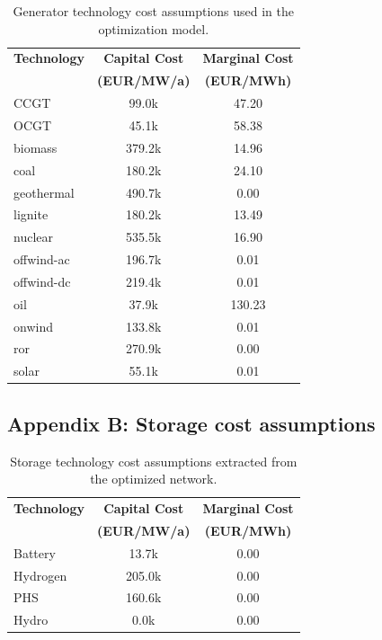\documentclass[preprint,12pt,nopreprintline]{elsarticle}
\begin{document}
\medskip
\noindent
\begin{table}[htbp]
\centering
\caption{Generator technology cost assumptions used in the optimization model.}
\label{tab:generator_costs_appendix}
\begin{tabular}{lcc}
\toprule
\textbf{Technology} & \textbf{Capital Cost} & \textbf{Marginal Cost} \\
 & \textbf{(EUR/MW/a)} & \textbf{(EUR/MWh)} \\
\midrule
CCGT & 99.0k & 47.20 \\
OCGT & 45.1k & 58.38 \\
biomass & 379.2k & 14.96 \\
coal & 180.2k & 24.10 \\
geothermal & 490.7k & 0.00 \\
lignite & 180.2k & 13.49 \\
nuclear & 535.5k & 16.90 \\
offwind-ac & 196.7k & 0.01 \\
offwind-dc & 219.4k & 0.01 \\
oil & 37.9k & 130.23 \\
onwind & 133.8k & 0.01 \\
ror & 270.9k & 0.00 \\
solar & 55.1k & 0.01 \\
\bottomrule
\end{tabular}
\end{table}

\newpage

\subsection{Appendix B: Storage cost assumptions} \label{Appendix_B}

\medskip
\noindent
\begin{table}[htbp]
\centering
\caption{Storage technology cost assumptions extracted from the optimized network.}
\label{tab:storage_costs_appendix}
\begin{tabular}{lcc}
\toprule
\textbf{Technology} & \textbf{Capital Cost} & \textbf{Marginal Cost} \\
 & \textbf{(EUR/MW/a)} & \textbf{(EUR/MWh)} \\
\midrule
Battery & 13.7k & 0.00 \\
Hydrogen & 205.0k & 0.00 \\
PHS & 160.6k & 0.00 \\
Hydro & 0.0k & 0.00 \\
\bottomrule
\end{tabular}
\end{table}
\end{document}
